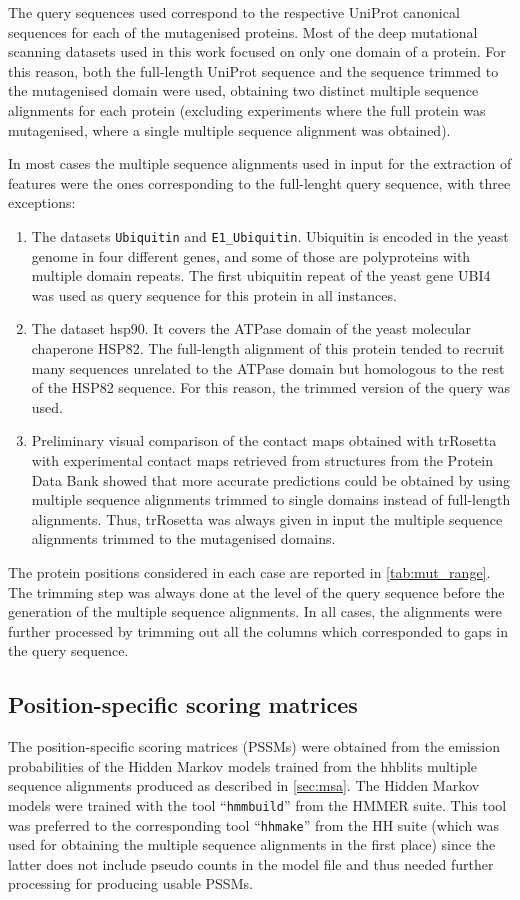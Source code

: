 The query sequences used correspond to the respective UniProt canonical sequences for each of the mutagenised proteins.
Most of the deep mutational scanning datasets used in this work focused on only one domain of a protein.
For this reason, both the full-length UniProt sequence and the sequence trimmed to the mutagenised domain were used, obtaining two distinct multiple sequence alignments for each protein (excluding experiments where the full protein was mutagenised, where a single multiple sequence alignment was obtained).

In most cases the multiple sequence alignments used in input for the extraction of features were the ones corresponding to the full-lenght query sequence, with three exceptions:
\begin{enumerate}[label= (\roman*)]
	\item The datasets \texttt{Ubiquitin} and \texttt{E1\_Ubiquitin}.
	      Ubiquitin is encoded in the yeast genome in four different genes, and some of those are polyproteins with multiple domain repeats.
	      The first ubiquitin repeat of the yeast gene UBI4 was used as query sequence for this protein in all instances.\
	\item The dataset hsp90. It covers the ATPase domain of the yeast molecular chaperone HSP82.
	      The full-length alignment of this protein tended to recruit many sequences unrelated to the ATPase domain but homologous to the rest of the HSP82 sequence.
	      For this reason, the trimmed version of the query was used.\
	\item Preliminary visual comparison of the contact maps obtained with trRosetta with experimental contact maps retrieved from structures from the Protein Data Bank showed that more accurate predictions could be obtained by using multiple sequence alignments trimmed to single domains instead of full-length alignments.
	      Thus, trRosetta was always given in input the multiple sequence alignments trimmed to the mutagenised domains.
\end{enumerate}

The protein positions considered in each case are reported in \cref{tab:mut_range}.
The trimming step was always done at the level of the query sequence before the generation of the multiple sequence alignments.
In all cases, the alignments were further processed by trimming out all the columns which corresponded to gaps in the query sequence.

\subsection{Position-specific scoring matrices}
The position-specific scoring matrices (PSSMs) were obtained from the emission probabilities of the Hidden Markov models trained from the hhblits multiple sequence alignments produced as described in \cref{sec:msa}.
The Hidden Markov models were trained with the tool ``\texttt{hmmbuild}'' from the HMMER suite.
This tool was preferred to the corresponding tool ``\texttt{hhmake}'' from the HH suite (which was used for obtaining the multiple sequence alignments in the first place) since the latter does not include pseudo counts in the model file and thus needed further processing for producing usable PSSMs.

